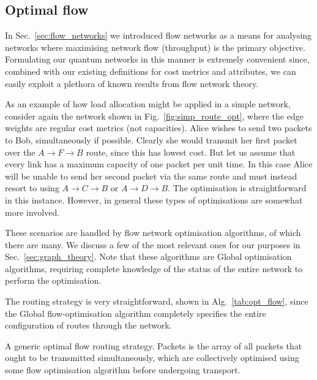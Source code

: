 \documentclass[aps,rmp,twocolumn,amsmath,amssymb,nofootinbib,superscriptaddress,longbibliography,floatfix]{revtex4-1}
\begin{document}
\subsection{Optimal flow}

In Sec.~\ref{sec:flow_networks} we introduced flow networks as a means for analysing networks where maximising network flow (throughput) is the primary objective. Formulating our quantum networks in this manner is extremely convenient since, combined with our existing definitions for cost metrics and attributes, we can easily exploit a plethora of known results from flow network theory.

As an example of how load allocation might be applied in a simple network, consider again the network shown in Fig.~\ref{fig:simp_route_opt}, where the edge weights are regular cost metrics (not capacities). Alice wishes to send two packets to Bob, simultaneously if possible. Clearly she would transmit her first packet over the \mbox{$A\to F\to B$} route, since this has lowest cost. But let us assume that every link has a maximum capacity of one packet per unit time. In this case Alice will be unable to send her second packet via the same route and must instead resort to using \mbox{$A\to C \to B$} or \mbox{$A\to D\to B$}. The optimisation is straightforward in this instance. However, in general these types of optimisations are somewhat more involved.

These scenarios are handled by flow network optimisation algorithms, of which there are many. We discuss a few of the most relevant ones for our purposes in Sec.~\ref{sec:graph_theory}. Note that these algorithms are {\sc Global} optimisation algorithms, requiring complete knowledge of the status of the entire network to perform the optimisation.

The routing strategy is very straightforward, shown in Alg.~\ref{tab:opt_flow}, since the {\sc Global} flow-optimisation algorithm completely specifies the entire configuration of routes through the network.

\begin{table}[!htb]
\caption{A generic optimal flow routing strategy. {\sc Packets} is the array of all packets that ought to be transmitted simultaneously, which are collectively optimised using some flow optimisation algorithm before undergoing transport.} \label{tab:opt_flow}
\end{table}
\end{document}
